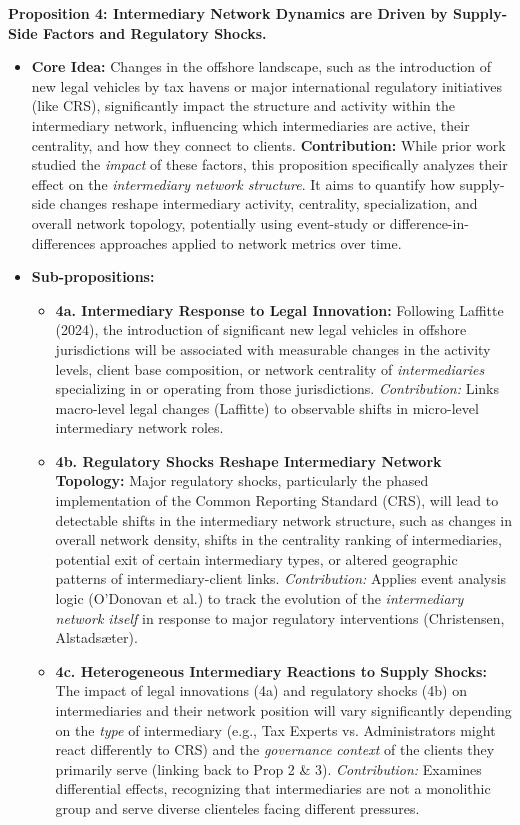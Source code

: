 \textbf{Proposition 4: Intermediary Network Dynamics are Driven by Supply-Side Factors and Regulatory Shocks.}
\begin{itemize}[leftmargin=*]
    \item \textbf{Core Idea:} Changes in the offshore landscape, such as the introduction of new legal vehicles by tax havens or major international regulatory initiatives (like CRS), significantly impact the structure and activity within the intermediary network, influencing which intermediaries are active, their centrality, and how they connect to clients.
    \textbf{Contribution:} While prior work studied the \textit{impact} of these factors, this proposition specifically analyzes their effect on the \textit{intermediary network structure}. It aims to quantify how supply-side changes reshape intermediary activity, centrality, specialization, and overall network topology, potentially using event-study or difference-in-differences approaches applied to network metrics over time.
    \item \textbf{Sub-propositions:}
    \begin{itemize}[leftmargin=\parindent]
        \item \textbf{4a. Intermediary Response to Legal Innovation:} Following Laffitte (2024), the introduction of significant new legal vehicles in offshore jurisdictions will be associated with measurable changes in the activity levels, client base composition, or network centrality of \textit{intermediaries} specializing in or operating from those jurisdictions. \textit{Contribution:} Links macro-level legal changes (Laffitte) to observable shifts in micro-level intermediary network roles.
        \item \textbf{4b. Regulatory Shocks Reshape Intermediary Network Topology:} Major regulatory shocks, particularly the phased implementation of the Common Reporting Standard (CRS), will lead to detectable shifts in the intermediary network structure, such as changes in overall network density, shifts in the centrality ranking of intermediaries, potential exit of certain intermediary types, or altered geographic patterns of intermediary-client links. \textit{Contribution:} Applies event analysis logic (O'Donovan et al.) to track the evolution of the \textit{intermediary network itself} in response to major regulatory interventions (Christensen, Alstadsæter).
        \item \textbf{4c. Heterogeneous Intermediary Reactions to Supply Shocks:} The impact of legal innovations (4a) and regulatory shocks (4b) on intermediaries and their network position will vary significantly depending on the \textit{type} of intermediary (e.g., Tax Experts vs. Administrators might react differently to CRS) and the \textit{governance context} of the clients they primarily serve (linking back to Prop 2 \& 3). \textit{Contribution:} Examines differential effects, recognizing that intermediaries are not a monolithic group and serve diverse clienteles facing different pressures.
    \end{itemize}
\end{itemize}
